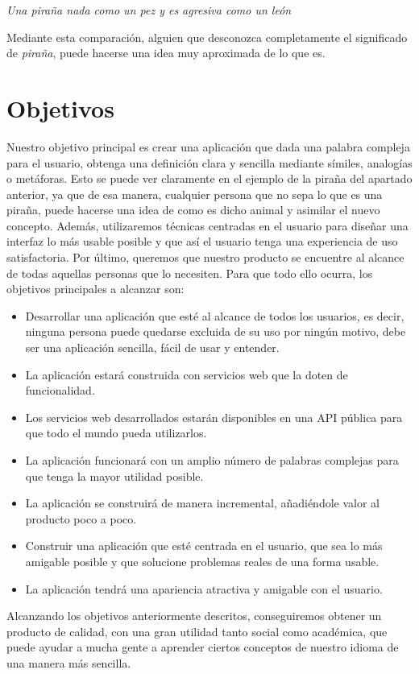 \textit{Una piraña nada como un pez y es agresiva como un león} \newline

Mediante esta comparación, alguien que desconozca completamente el significado de \textit{piraña}, puede hacerse una idea muy aproximada de lo que es.


\section{Objetivos}
\label{cap:sec:objetivos}

Nuestro objetivo principal es crear una aplicación que dada una palabra compleja para el usuario, obtenga una definición clara y sencilla mediante símiles, analogías o metáforas. 
Esto se puede ver claramente en el ejemplo de la piraña del apartado anterior, ya que de esa manera, cualquier persona que no sepa lo que es una piraña, puede hacerse una idea de como es dicho animal y asimilar el nuevo concepto. Además, utilizaremos técnicas centradas en el usuario para diseñar una interfaz lo más usable posible y que así el usuario tenga una experiencia de uso satisfactoria. Por último, queremos que nuestro producto se encuentre al alcance de todas aquellas personas que lo necesiten.
 Para que todo ello ocurra, los objetivos principales a alcanzar son:
\begin{itemize}
	\item Desarrollar una aplicación que esté al alcance de todos los usuarios, es decir, ninguna persona puede quedarse excluida de su uso por ningún motivo, debe ser una aplicación sencilla, fácil de usar y entender.
	\item La aplicación estará construida con servicios web que la doten de funcionalidad.
	\item Los servicios web desarrollados estarán disponibles en una API pública para que todo el mundo pueda utilizarlos.	
	\item La aplicación funcionará con un amplio número de palabras complejas para que tenga la mayor utilidad posible.
	\item La aplicación se construirá de manera incremental, añadiéndole valor al producto poco a poco.	
	\item Construir una aplicación que esté centrada en el usuario, que sea lo más amigable posible y que solucione problemas reales de una forma usable.		
	\item La aplicación tendrá una apariencia atractiva y amigable con el usuario.
\end{itemize}
Alcanzando los objetivos anteriormente descritos, conseguiremos obtener un producto de calidad, con una gran utilidad tanto social como académica, que puede ayudar a mucha gente a aprender ciertos conceptos de nuestro idioma de una manera más sencilla.

